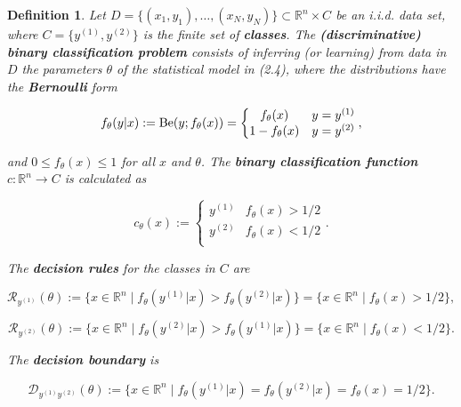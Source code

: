 \documentclass{report}
\newtheorem{definition}{Definition}[chapter]
\begin{document}
\begin{definition}
Let $D = \{(x_1,y_1),\dots,(x_N,y_N)\} \subset \mathbb{R}^n \times C$ be an i.i.d. data set, where $C = \{y^{(1)}, y^{(2)}\}$ is the finite set of \textbf{classes}. The \textbf{(discriminative) binary classification problem} consists of inferring (or learning) from data in $D$ the parameters $\theta$ of the statistical model in (2.4), where the distributions have the \textbf{Bernoulli} form

\begin{equation}
f_\theta(y|x) := \textup{Be}(y;f_\theta(x)) = \left\{\begin{matrix}
f_\theta(x) & y=y^{(1)}\\
1 - f_\theta(x) & y = y^{(2)} \\
\end{matrix}\right.,
\end{equation}

and $0 \leq f_\theta(x) \leq 1$ for all $x$ and $\theta$. The \textbf{binary classification function} $c : \mathbb{R}^n \to C$ is calculated as

\begin{equation}
c_\theta(x) := \left\{\begin{matrix}
y^{(1)} & f_\theta(x) > 1/2\\
y^{(2)} & f_\theta(x) < 1/2\\
\end{matrix}\right..
\end{equation}

The \textbf{decision rules} for the classes in $C$ are

\begin{equation}
\mathcal{R}_{y^{(1)}}(\theta) := \{x \in \mathbb{R}^n \mid f_\theta(y^{(1)}|x) > f_\theta(y^{(2)}|x)\} = \{x \in \mathbb{R}^n \mid f_\theta(x) > 1/2\},
\end{equation}

\begin{equation}
\mathcal{R}_{y^{(2)}}(\theta) := \{x \in \mathbb{R}^n \mid f_\theta(y^{(2)}|x) > f_\theta(y^{(1)}|x)\} = \{x \in \mathbb{R}^n \mid f_\theta(x) < 1/2\}.
\end{equation}

The \textbf{decision boundary} is

\begin{equation}
\mathcal{D}_{y^{(1)}y^{(2)}}(\theta) := \{x \in \mathbb{R}^n \mid f_\theta(y^{(1)}|x) = f_\theta(y^{(2)}|x) = f_\theta(x) = 1/2\}.
\end{equation}
\end{definition}
\end{document}
